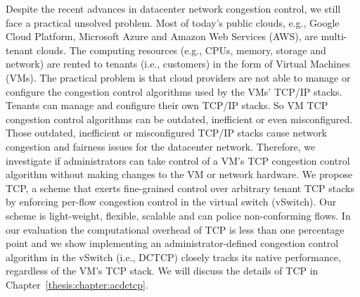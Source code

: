 Despite the recent advances in datacenter network congestion control,
we still face a practical unsolved problem. Most of today's public clouds, e.g., 
Google Cloud Platform, Microsoft Azure and Amazon Web Services (AWS), are multi-tenant clouds. 
The computing resources (e.g., CPUs, memory, storage and network) are rented to 
tenants (i.e., customers) in the form of Virtual Machines (VMs). The practical problem is 
that cloud providers are not able to manage or configure the congestion control algorithms used 
by the VMs' TCP/IP stacks. Tenants can manage and configure their own TCP/IP stacks. So VM TCP congestion 
control algorithms can be outdated, inefficient or even misconfigured. Those outdated, inefficient or 
misconfigured TCP/IP stacks cause network congestion and fairness issues for the datacenter network. 
Therefore, we investigate if administrators can take control of a VM's
TCP congestion control algorithm without making changes
to the VM or network hardware. We propose \acdc{} TCP,
a scheme that exerts fine-grained control over arbitrary tenant
TCP stacks by enforcing per-flow congestion control in
the virtual switch (vSwitch). Our scheme is light-weight,
flexible, scalable and can police non-conforming flows. In
our evaluation the computational overhead of \acdc{} TCP
is less than one percentage point and we show implementing
an administrator-defined congestion control algorithm in the
vSwitch (i.e., DCTCP) closely tracks its native performance,
regardless of the VM's TCP stack.
We will discuss the details of \acdc{} TCP in Chapter~\ref{thesis:chapter:acdctcp}.

